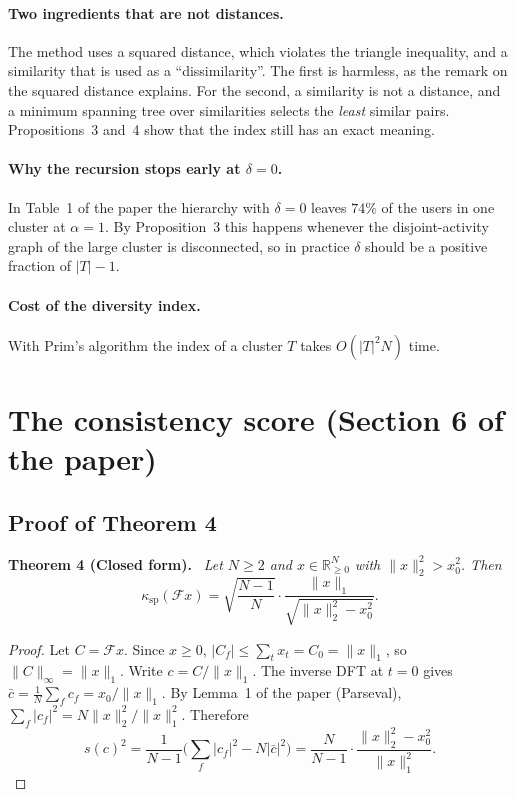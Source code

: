 \documentclass[11pt]{article}
\newcommand{\R}{\mathbb{R}}
\newcommand{\F}{\mathcal{F}}
\newcommand{\norm}[1]{\lVert #1 \rVert}
\newenvironment{result}[1]{\par\medskip\noindent\textbf{#1.}\ \itshape}{\par\smallskip}
\theoremstyle{remark}\newtheorem{remark}{Remark}\renewcommand{\theremark}{S\arabic{remark}}
\begin{document}
\paragraph{Two ingredients that are not distances.} The method uses a squared distance, which violates the triangle inequality, and a similarity that is used as a ``dissimilarity''. The first is harmless, as the remark on the squared distance explains. For the second, a similarity is not a distance, and a minimum spanning tree over similarities selects the \emph{least} similar pairs. Propositions~3 and~4 show that the index still has an exact meaning.

\paragraph{Why the recursion stops early at $\delta=0$.} In Table~1 of the paper the hierarchy with $\delta=0$ leaves $74\%$ of the users in one cluster at $\alpha=1$. By Proposition~3 this happens whenever the disjoint-activity graph of the large cluster is disconnected, so in practice $\delta$ should be a positive fraction of $|T|-1$.

\paragraph{Cost of the diversity index.} With Prim's algorithm the index of a cluster $T$ takes $O(|T|^2N)$ time.

\section{The consistency score (Section 6 of the paper)}\label{s:score}

\subsection*{Proof of Theorem 4}
\begin{result}{Theorem 4 (Closed form)}
Let $N\ge2$ and $x\in\R^N_{\ge0}$ with $\norm{x}_2^2>x_0^2$. Then
\[
  \kappa_{\mathrm{sp}}(\F x)=\sqrt{\frac{N-1}{N}}\cdot\frac{\norm{x}_1}{\sqrt{\norm{x}_2^2-x_0^2}} .
\]
\end{result}
\begin{proof}
Let $C=\F x$. Since $x\ge0$, $|C_f|\le\sum_tx_t=C_0=\norm{x}_1$, so $\norm{C}_\infty=\norm{x}_1$. Write $c=C/\norm{x}_1$. The inverse DFT at $t=0$ gives $\bar c=\frac1N\sum_fc_f=x_0/\norm{x}_1$. By Lemma~1 of the paper (Parseval), $\sum_f|c_f|^2=N\norm{x}_2^2/\norm{x}_1^2$. Therefore
\[
  s(c)^2=\frac{1}{N-1}\Big(\sum_f|c_f|^2-N|\bar c|^2\Big)=\frac{N}{N-1}\cdot\frac{\norm{x}_2^2-x_0^2}{\norm{x}_1^2}.
\]

\end{proof}
\end{document}
